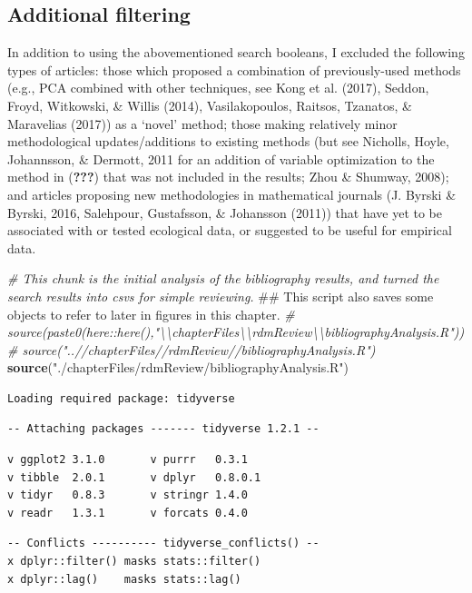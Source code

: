 \documentclass[12pt,twoside,openany]{reedthesis}
\newenvironment{Shaded}{\begin{snugshade}}{\end{snugshade}}
\newcommand{\KeywordTok}[1]{\textcolor[rgb]{0.13,0.29,0.53}{\textbf{#1}}}
\newcommand{\StringTok}[1]{\textcolor[rgb]{0.31,0.60,0.02}{#1}}
\newcommand{\CommentTok}[1]{\textcolor[rgb]{0.56,0.35,0.01}{\textit{#1}}}
\newcommand{\NormalTok}[1]{#1}
\begin{document}
\subsection{Additional filtering}\label{additional-filtering}

In addition to using the abovementioned search booleans, I excluded the
following types of articles: those which proposed a combination of
previously-used methods (e.g., PCA combined with other techniques, see
Kong et al. (2017), Seddon, Froyd, Witkowski, \& Willis (2014),
Vasilakopoulos, Raitsos, Tzanatos, \& Maravelias (2017)) as a `novel'
method; those making relatively minor methodological updates/additions
to existing methods (but see Nicholls, Hoyle, Johannsson, \& Dermott,
2011 for an addition of variable optimization to the method in
({\textbf{???}}) that was not included in the results; Zhou \& Shumway,
2008); and articles proposing new methodologies in mathematical journals
(J. Byrski \& Byrski, 2016, Salehpour, Gustafsson, \& Johansson (2011))
that have yet to be associated with or tested ecological data, or
suggested to be useful for empirical data.
\begin{Shaded}
\begin{Highlighting}[]
\CommentTok{# This chunk is the initial analysis of the bibliography results, and turned the search results into csvs for simple reviewing. }
\NormalTok{## This script also saves some objects to refer to later in figures in this chapter. }
\CommentTok{# source(paste0(here::here(),"\textbackslash{}\textbackslash{}chapterFiles\textbackslash{}\textbackslash{}rdmReview\textbackslash{}\textbackslash{}bibliographyAnalysis.R"))}
\CommentTok{# source("..//chapterFiles//rdmReview//bibliographyAnalysis.R")}
\KeywordTok{source}\NormalTok{(}\StringTok{"./chapterFiles/rdmReview/bibliographyAnalysis.R"}\NormalTok{)}
\end{Highlighting}
\end{Shaded}
\begin{verbatim}
Loading required package: tidyverse
\end{verbatim}
\begin{verbatim}
-- Attaching packages ------- tidyverse 1.2.1 --
\end{verbatim}
\begin{verbatim}
v ggplot2 3.1.0       v purrr   0.3.1  
v tibble  2.0.1       v dplyr   0.8.0.1
v tidyr   0.8.3       v stringr 1.4.0  
v readr   1.3.1       v forcats 0.4.0  
\end{verbatim}
\begin{verbatim}
-- Conflicts ---------- tidyverse_conflicts() --
x dplyr::filter() masks stats::filter()
x dplyr::lag()    masks stats::lag()
\end{verbatim}
\end{document}
